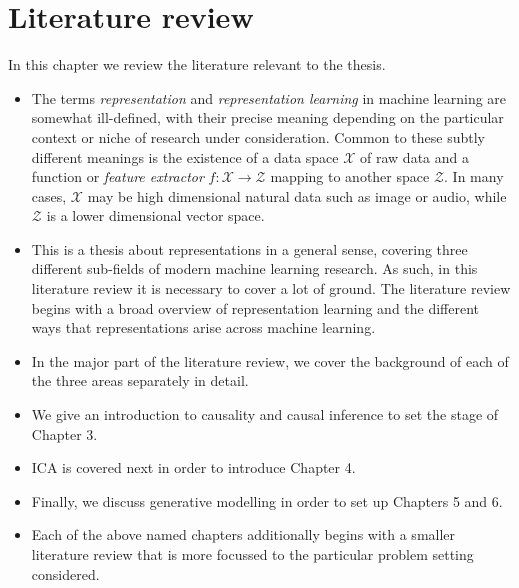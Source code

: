 
\chapter{Literature review}

\ifpdf
    \graphicspath{{Chapter2/Figs/Raster/}{Chapter2/Figs/PDF/}{Chapter2/Figs/}}
\else
    \graphicspath{{Chapter2/Figs/Vector/}{Chapter2/Figs/}}
\fi

In this chapter we review the literature relevant to the thesis.

\begin{itemize}
\item The terms \emph{representation} and \emph{representation learning} in machine learning are somewhat ill-defined, with their precise meaning depending on the particular context or niche of research under consideration. Common to these subtly different meanings is the existence of a data space $\mathcal{X}$ of raw data and a function or \emph{feature extractor} $f:\mathcal{X} \to \mathcal{Z}$ mapping to another space $\mathcal{Z}$. In many cases, $\mathcal{X}$ may be high dimensional natural data such as image or audio, while $\mathcal{Z}$ is a lower dimensional vector space.
\item This is a thesis about representations in a general sense, covering three different sub-fields of modern machine learning research. As such, in this literature review it is necessary to cover a lot of ground. The literature review begins with a broad overview of representation learning and the different ways that representations arise across machine learning.
\item In the major part of the literature review, we cover the background of each of the three areas separately in detail.
\item We give an introduction to causality and causal inference to set the stage of Chapter 3.
\item ICA is covered next in order to introduce Chapter 4.
\item Finally, we discuss generative modelling in order to set up Chapters 5 and 6.
\item Each of the above named chapters additionally begins with a smaller literature review that is more focussed to the particular problem setting considered.
\end{itemize}